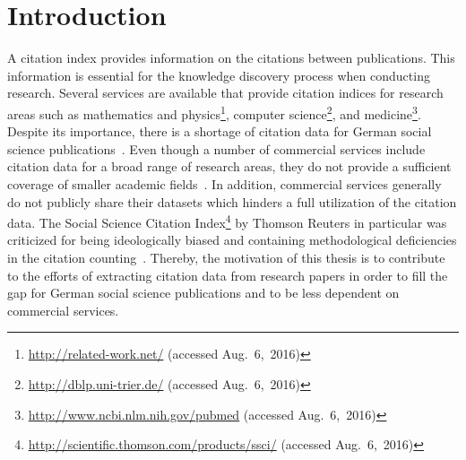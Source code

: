 \chapter{Introduction}\label{cha:introduction}

A citation index provides information on the citations between publications.
This information is essential for the knowledge discovery process when conducting research.
Several services are available that provide citation indices for research areas such as mathematics and physics\footnote{\url{http://related-work.net/} (accessed Aug.~6,~2016)}, computer science\footnote{\url{http://dblp.uni-trier.de/} (accessed Aug.~6,~2016)}, and medicine\footnote{\url{http://www.ncbi.nlm.nih.gov/pubmed} (accessed Aug.~6,~2016)}.
Despite its importance, there is a shortage of citation data for German social science publications~\citep{herb2015open}.
Even though a number of commercial services include citation data for a broad range of research areas, they do not provide a sufficient coverage of smaller academic fields~\citep{mayr2007exploratory}.
In addition, commercial services generally do not publicly share their datasets which hinders a full utilization of the citation data.
The Social Science Citation Index\footnote{\url{http://scientific.thomson.com/products/ssci/} (accessed Aug.~6,~2016)} by Thomson Reuters in particular was criticized for being ideologically biased and containing methodological deficiencies in the citation counting~\cite{klein2004social}.
Thereby, the motivation of this thesis is to contribute to the efforts of extracting citation data from research papers in order to fill the gap for German social science publications and to be less dependent on commercial services.

\bigskip


